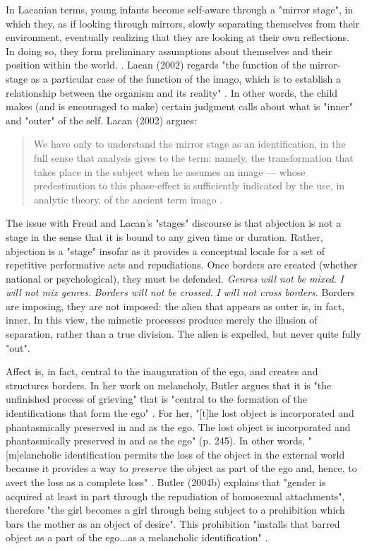 \documentclass[letterpaper,12pt]{turabian-researchpaper}
\begin{document}
In Lacanian terms, young infants become self-aware through a "mirror stage", in which they, as if looking through mirrors, slowly separating themselves from their environment, eventually realizing that they are looking at their own reflections. In doing so, they form preliminary assumptions about themselves and their position within the world. \autocite[3]{lacan_ecrits_2002}. Lacan (2002) regards "the function of the mirror-stage as a particular case of the function of the imago, which is to establish a relationship between the organism and its reality" \autocite[3]{lacan_ecrits_2002}. In other words, the child makes (and is encouraged to make) certain judgment calls about what is "inner" and "outer" of the self. Lacan (2002) argues:
\begin{quotation}
	\noindent We have only to understand the mirror stage as an identification, in the full sense that analysis gives to the term: namely, the transformation that takes place in the subject when he assumes an image --- whose predestination to this phase-effect is sufficiently indicated by the use, in analytic theory, of the ancient term imago \autocite[2--3]{lacan_ecrits_2002}.
\end{quotation}
\noindent 
The issue with Freud and Lacan's "stages" discourse is that abjection is not a stage in the sense that it is bound to any given time or duration. Rather, abjection is a "stage" insofar as it provides a conceptual locale for a set of repetitive performative acts and repudiations. Once borders are created (whether national or psychological), they must be defended. \textit{Genres will not be mixed}. \textit{I will not mix genres}. \textit{Borders will not be crossed}. \textit{I will not cross borders}. Borders are imposing, they are not imposed: the alien that appears as outer is, in fact, inner. In this view, the mimetic processes produce merely the illusion of separation, rather than a true division. The alien is expelled, but never quite fully "out".

Affect is, in fact, central to the inauguration of the ego, and creates and structures borders. In her work on melancholy, Butler argues that it is "the unfinished process of grieving" that is "central to the formation of the identifications that form the ego" \autocite[245]{butler_melancholy_2004}. For her, "[t]he lost object is incorporated and phantasmically preserved in and as the ego. The lost object is incorporated and phantasmically preserved in and as the ego" (p. 245). In other words, "[m]elancholic identification permits the loss of the object in the external world because it provides a way to \textit{preserve} the object as part of the ego and, hence, to avert the loss as a complete loss" \autocite[246]{butler_melancholy_2004}. Butler (2004b) explains that "gender is acquired at least in part through the repudiation of homosexual attachments", therefore "the girl becomes a girl through being subject to a prohibition which bars the mother as an object of desire". This prohibition "installs that barred object as a part of the ego...as a melancholic identification" \autocite[248]{butler_melancholy_2004}.
\end{document}
